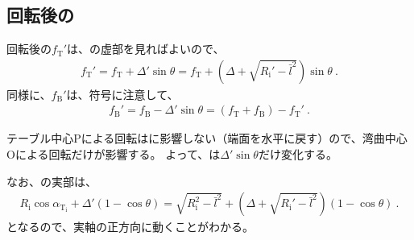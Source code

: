 \subsection{回転後の\AlocationLength}
回転後の\TopReAlocationLength$f_\mathrm T'$は、の虚部を見ればよいので、
\begin{align}
  \label{eq:saifuriwakeT}
  f_\mathrm T'
  = f_\mathrm T+\Delta'\sin\theta
  = f_\mathrm T+\left(\Delta+\sqrt{R_\mathrm i'-\bar l^2}\right)\sin\theta\ .
\end{align}
同様に、\BottomReAlocationLength$f_\mathrm B'$は、符号に注意して、
\begin{align*}
  f_\mathrm B' = f_\mathrm B-\Delta'\sin\theta = (f_\mathrm T+f_\mathrm B)-f_\mathrm T'\ .
\end{align*}
\begin{hosoku}
テーブル中心Pによる回転は\AlocationLength に影響しない（端面を水平に戻す）ので、湾曲中心Oによる回転だけが影響する。
よって、\AlocationLength は$\Delta'\sin\theta$だけ変化する。
\end{hosoku}
なお、の実部は、
\begin{align*}
  R_\mathrm i\cos\alpha_{\mathrm T_\mathrm i}+\Delta'(1-\cos\theta)
  = \sqrt{R_\mathrm i^2-\bar l^2}+\left(\Delta+\sqrt{R_\mathrm i'-\bar l^2}\right)(1-\cos\theta)\ .
\end{align*}
となるので、実軸の正方向に動くことがわかる。


